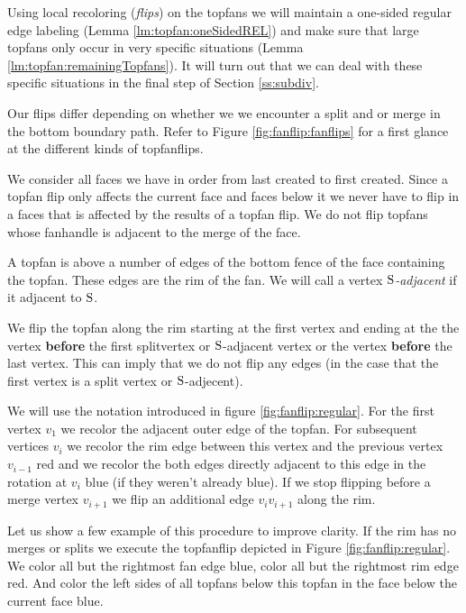 Using local recoloring (\emph{flips}) on the topfans we will maintain a one-sided regular edge labeling (Lemma \ref{lm:topfan:oneSidedREL}) and make sure that large topfans only occur in very specific situations (Lemma \ref{lm:topfan:remainingTopfans}). It will turn out that we can deal with these specific situations in the final step of Section \ref{ss:subdiv}.

Our flips differ depending on whether we we encounter a split and or merge in the bottom boundary path. Refer to Figure \ref{fig:fanflip:fanflips} for a first glance at the different kinds of topfanflips.






We consider all faces we have in order from last created to first created. Since a topfan flip only affects the current face and faces below it we never have to flip in a faces that is affected by the results of a topfan flip.
We do not flip topfans whose fanhandle is adjacent to the merge of the face.

A topfan is above a number of edges of the bottom fence of the face containing the topfan. These edges are the rim of the fan. We will call a vertex \emph{$\mathrm{S}$-adjacent} if it adjacent to $\mathrm{S}$.

We flip the topfan along the rim starting at the first vertex and ending at the the vertex \textbf{before} the first splitvertex or $\mathrm{S}$-adjacent vertex or the vertex \textbf{before} the last vertex. This can imply that we do not flip any edges (in the case that the first vertex is a split vertex or $\mathrm{S}$-adjecent).

We will use the notation introduced in figure \ref{fig:fanflip:regular}.
For the first vertex $v_1$ we recolor the adjacent outer edge of the topfan. For subsequent vertices $v_i$ we recolor the rim edge between this vertex and the previous vertex $v_{i-1}$ red and we recolor the both edges directly adjacent to this edge in the rotation at $v_i$ blue (if they weren't already blue).
If we stop flipping before a merge vertex $v_{i+1}$ we flip an additional edge $v_i v_{i+1}$ along the rim.


Let us show a few example of this procedure to improve clarity.
If the rim has no merges or splits we execute the topfanflip depicted in Figure \ref{fig:fanflip:regular}. We color all but the rightmost fan edge blue, color all but the rightmost rim edge red. And color the left sides of all topfans below this topfan in the face below the current face blue.

